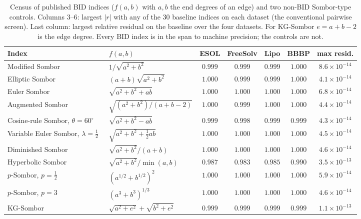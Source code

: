 \begin{table}[h]
\centering
\small
\caption{Census of published BID indices ($f(a,b)$ with $a,b$ the end degrees of an edge) and two non-BID Sombor-type controls. Columns 3--6: largest $|r|$ with any of the $30$ baseline indices on each dataset (the conventional pairwise screen). Last column: largest relative residual on the baseline over the four datasets. For KG-Sombor $e=a+b-2$ is the edge degree. Every BID index is in the span to machine precision; the controls are not.}
\label{tab:census}
\footnotesize
\setlength{\tabcolsep}{3pt}
\begin{tabular}{llccccc}
\toprule
Index & $f(a,b)$ & ESOL & FreeSolv & Lipo & BBBP & max resid.\\
\midrule
Modified Sombor~\cite{KulliGutman2021Modified} & $1/\sqrt{a^2+b^2}$ & $0.999$ & $0.999$ & $0.999$ & $1.000$ & $8.6\times10^{-14}$\\
Elliptic Sombor~\cite{GutmanFurtulaOz2024Elliptic} & $(a+b)\sqrt{a^2+b^2}$ & $1.000$ & $0.999$ & $0.999$ & $1.000$ & $4.1\times10^{-14}$\\
Euler Sombor~\cite{Gutman2024Euler} & $\sqrt{a^2+b^2+ab}$ & $1.000$ & $1.000$ & $1.000$ & $1.000$ & $6.8\times10^{-14}$\\
Augmented Sombor~\cite{DasGutmanAli2026ASO} & $\sqrt{(a^2+b^2)/(a+b-2)}$ & $1.000$ & $0.999$ & $1.000$ & $1.000$ & $4.4\times10^{-14}$\\
Cosine-rule Sombor, $\theta=60^\circ$~\cite{NyauliBuragohain2026CoRSO} & $\sqrt{a^2+b^2-ab}$ & $0.999$ & $0.998$ & $0.999$ & $0.999$ & $4.3\times10^{-14}$\\
Variable Euler Sombor, $\lambda=\tfrac12$~\cite{GutmanRedzepovicKizilirmakKulli2025Euler} & $\sqrt{a^2+b^2+\tfrac12 ab}$ & $1.000$ & $1.000$ & $1.000$ & $1.000$ & $4.5\times10^{-14}$\\
Diminished Sombor~\cite{MovahediGutmanRedzepovicFurtula2026} & $\sqrt{a^2+b^2}/(a+b)$ & $1.000$ & $1.000$ & $1.000$ & $1.000$ & $4.6\times10^{-14}$\\
Hyperbolic Sombor~\cite{BarmanDas2026Hyperbolic} & $\sqrt{a^2+b^2}/\min(a,b)$ & $0.987$ & $0.983$ & $0.985$ & $0.990$ & $3.5\times10^{-13}$\\
$p$-Sombor, $p=\tfrac12$~\cite{RetiDoslicAli2021} & $(a^{1/2}+b^{1/2})^{2}$ & $1.000$ & $1.000$ & $1.000$ & $1.000$ & $5.9\times10^{-14}$\\
$p$-Sombor, $p=3$~\cite{RetiDoslicAli2021} & $(a^3+b^3)^{1/3}$ & $1.000$ & $1.000$ & $1.000$ & $1.000$ & $4.6\times10^{-14}$\\
KG-Sombor~\cite{KulliHarishChaluvarajuGutman2022KG} & $\sqrt{a^2+e^2}+\sqrt{b^2+e^2}$ & $0.999$ & $0.999$ & $0.999$ & $0.999$ & $1.1\times10^{-13}$\\

\end{tabular}
\end{table}
